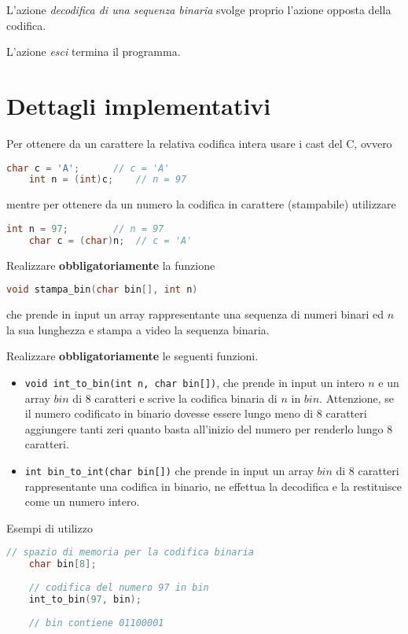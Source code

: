 \documentclass[11pt,a4paper]{article}
\begin{document}
	L'azione \textit{decodifica di una sequenza binaria} svolge proprio l'azione opposta della codifica.
	
	L'azione \textit{esci} termina il programma.
	
	\section{Dettagli implementativi}
	
	\noindent Per ottenere da un carattere la relativa codifica intera usare i cast del C, ovvero
	\begin{lstlisting}[language=C++,xleftmargin=+\leftmargini]
	char c = 'A';      // c = 'A'
	int n = (int)c;    // n = 97
	\end{lstlisting}
	mentre per ottenere da un numero la codifica in carattere (stampabile) utilizzare
	\begin{lstlisting}[language=C++,xleftmargin=+\leftmargini]
	int n = 97;        // n = 97
	char c = (char)n;  // c = 'A'
	\end{lstlisting}
	
	\noindent Realizzare \textbf{obbligatoriamente} la funzione
	\begin{lstlisting}[language=C++,xleftmargin=+\leftmargini]
	void stampa_bin(char bin[], int n)
	\end{lstlisting}
	che prende in input un array rappresentante una sequenza di numeri binari ed $n$ la sua lunghezza e stampa a video la sequenza binaria.
	
	\noindent Realizzare \textbf{obbligatoriamente} le seguenti funzioni.
	\begin{itemize}
		\item \verb|void int_to_bin(int n, char bin[])|, che prende in input un intero $n$ e un array $bin$ di 8 caratteri e scrive la codifica binaria di $n$ in $bin$. Attenzione, se il numero codificato in binario dovesse essere lungo meno di 8 caratteri aggiungere tanti zeri quanto basta all'inizio del numero per renderlo lungo 8 caratteri.
		\item \verb|int bin_to_int(char bin[])| che prende in input un array $bin$ di 8 caratteri rappresentante una codifica in binario, ne effettua la decodifica e la restituisce come un numero intero.
	\end{itemize}
	Esempi di utilizzo
	\begin{lstlisting}[language=C++,xleftmargin=+\leftmargini]
	// spazio di memoria per la codifica binaria
	char bin[8];
	
	// codifica del numero 97 in bin
	int_to_bin(97, bin);
	
	// bin contiene 01100001
	\end{lstlisting}
	
\end{document}
